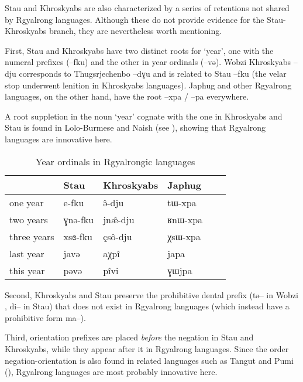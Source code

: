 \documentclass[oneside,a4paper,11pt]{article}
\newcommand{\ipa}[1]{{\phon #1}} %
\begin{document}
Stau and Khroskyabs are also characterized by a series of retentions not shared by Rgyalrong languages. Although these do not provide evidence for the Stau-Khroskyabs branch, they are nevertheless worth mentioning.

First, Stau and Khroskyabs have two distinct roots for `year', one with the numeral prefixes (\ipa{--fku}) and the other in year ordinals (\ipa{--və}). Wobzi Khroskyabs \ipa{--dju} corresponds to Thugsrjechenbo \ipa{--dɣu} and is related to Stau \ipa{--fku} (the velar stop underwent lenition in Khroskyabs languages). Japhug and other Rgyalrong languages, on the other hand, have the root \ipa{--xpa} / \ipa{--pa} everywhere. 

A root suppletion in the noun `year' cognate with the one in Khroskyabs and Stau is found in Lolo-Burmese and Naish (see \citealt{jacques.michaud11naish}), showing that Rgyalrong languages are innovative here.

  \begin{table}[H]
  \caption{Year ordinals in Rgyalrongic languages} \label{tab:year} \centering
 \begin{tabular}{llllll}
 \toprule
 & 	Stau & 	Khroskyabs & 	Japhug & 	\\	
 \midrule
one year & 	\ipa{e-fku} & 	\ipa{ə̂-dju } & 	\ipa{tɯ-xpa} & 	\\	
two years & 	\ipa{ɣnə-fku} & 	\ipa{jnæ̂-dju } & 	\ipa{ʁnɯ-xpa} & 	\\	
three years & 	\ipa{xsɞ-fku} & 	\ipa{çsô-dju } & 	\ipa{χsɯ-xpa} & 	\\	
 \midrule
last year & 	\ipa{javə} & 	\ipa{aχpî} & 	\ipa{japa} & 	\\	
this year & 	\ipa{pəvə} & 	\ipa{pîvi} & 	\ipa{ɣɯjpa} & 	\\	
\bottomrule
\end{tabular}
\end{table}


Second, Khroskyabs and Stau preserve the prohibitive dental prefix (\ipa{tə--} in Wobzi \citealt[130-1]{lai13affixale}, \ipa{di--} in Stau) that does not exist in Rgyalrong languages (which instead have a prohibitive form \ipa{ma--}).

Third, orientation prefixes are placed \textit{before} the negation in Stau and Khroskyabs, while they appear after it in Rgyalrong languages. Since the order negation-orientation is also found in related languages such as Tangut and Pumi (\citealt{jacques11tangut.verb}), Rgyalrong languages are most probably innovative here.
\end{document}

